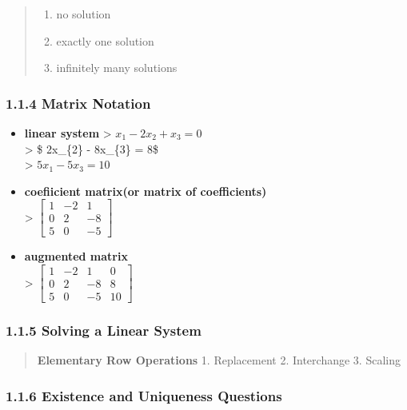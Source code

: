 \documentclass[11pt]{article}
\providecommand{\tightlist}{%
      \setlength{\itemsep}{0pt}\setlength{\parskip}{0pt}}
\begin{document}
\begin{quote}
\begin{enumerate}
\def\labelenumi{\arabic{enumi}.}
\tightlist
\item
  no solution
\item
  exactly one solution
\item
  infinitely many solutions
\end{enumerate}
\end{quote}

    \hypertarget{matrix-notation}{%
\subsubsection{1.1.4 Matrix Notation}\label{matrix-notation}}

\begin{itemize}
\item
  \textbf{linear system} \textgreater{} \(x_{1} -2x_{2} + x_{3} = 0\)\\
  \textgreater{} \$ 2x\_\{2\} - 8x\_\{3\} = 8\$\\
  \textgreater{} \(5x_{1} -5x_{3} = 10\)
\item
  \textbf{coefiicient matrix(or matrix of coefficients)}\\
  \textgreater{}
  \(\begin{bmatrix} 1 & -2 & 1 \\ 0 & 2 & -8 \\ 5 & 0 & -5 \end{bmatrix}\)
\item
  \textbf{augmented matrix}\\
  \textgreater{}
  \(\begin{bmatrix} 1 & -2 & 1 & 0 \\ 0 & 2 & -8 & 8\\ 5 & 0 & -5 & 10\end{bmatrix}\)
\end{itemize}

    \hypertarget{solving-a-linear-system}{%
\subsubsection{1.1.5 Solving a Linear
System}\label{solving-a-linear-system}}

\begin{quote}
\textbf{Elementary Row Operations} 1. Replacement 2. Interchange 3.
Scaling
\end{quote}

    \hypertarget{existence-and-uniqueness-questions}{%
\subsubsection{1.1.6 Existence and Uniqueness
Questions}\label{existence-and-uniqueness-questions}}
\end{document}
